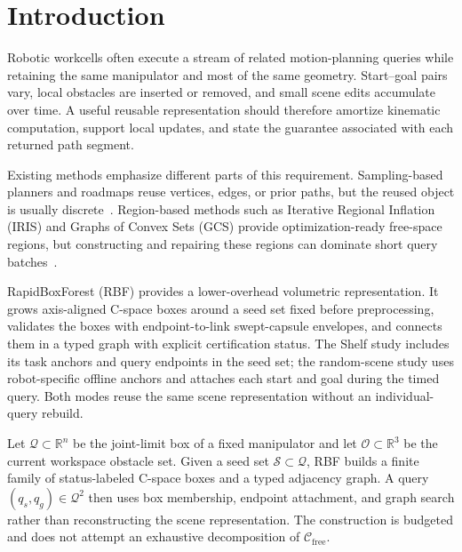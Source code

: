 \documentclass[journal]{IEEEtran}
\newcommand{\rbf}{RBF}
\newcommand{\Real}{\ensuremath{\mathbb{R}}}
\newcommand{\Cfree}{\ensuremath{\mathcal{C}_{\mathrm{free}}}}
\newcommand{\calO}{\ensuremath{\mathcal{O}}}
\newcommand{\Q}{\ensuremath{\mathcal{Q}}}
\newcommand{\cspace}{\mbox{C-space}}
\begin{document}
\section{Introduction}\label{sec:intro}

Robotic workcells often execute a stream of related motion-planning queries
while retaining the same manipulator and most of the same geometry. Start--goal
pairs vary, local obstacles are inserted or removed, and small scene edits
accumulate over time. A useful reusable representation should therefore
amortize kinematic computation, support local updates, and state the guarantee
associated with each returned path segment.

Existing methods emphasize different parts of this requirement. Sampling-based
planners and roadmaps reuse vertices, edges, or prior paths, but the reused
object is usually discrete~\cite{lavalle2006planning,lavalle1998rapidly,
kavraki1996probabilistic,karaman2011sampling}. Region-based methods such as
Iterative Regional Inflation (IRIS) and Graphs of Convex Sets (GCS) provide
optimization-ready free-space regions, but constructing and repairing these
regions can dominate short query batches~\cite{deits2015computing,
marcucci2023motion,marcucci2024shortest}.

RapidBoxForest (\rbf{}) provides a lower-overhead volumetric
representation. It grows axis-aligned \cspace{} boxes around a seed set fixed
before preprocessing, validates the boxes with endpoint-to-link swept-capsule
envelopes, and connects them in a typed graph with explicit certification
status. The Shelf study includes its task anchors and query endpoints in the
seed set; the random-scene study uses robot-specific offline anchors and
attaches each start and goal during the timed query. Both modes reuse the same
scene representation without an individual-query rebuild.

Let $\Q\subset\Real^n$ be the joint-limit box of a fixed manipulator and let
$\calO\subset\Real^3$ be the current workspace obstacle set. Given a seed set
$\mathcal{S}\subset\Q$, \rbf{} builds a finite family of status-labeled
\cspace{} boxes and a typed adjacency graph. A query $(q_s,q_g)\in\Q^2$ then
uses box membership, endpoint attachment, and graph search rather than
reconstructing the scene representation. The construction is budgeted and does
not attempt an exhaustive decomposition of $\Cfree$.
\end{document}
